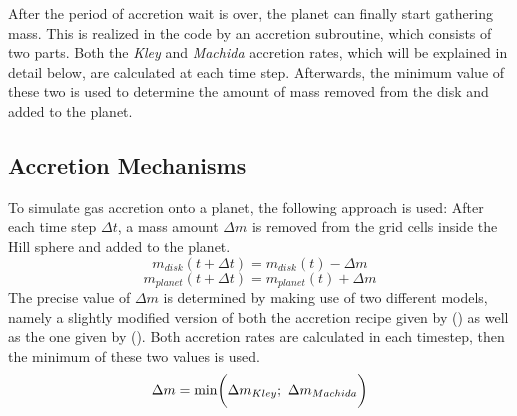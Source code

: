     After the period of accretion wait is over, the planet can finally 
    start gathering mass. This is realized in the code by an accretion
    subroutine, which consists of two parts. Both the \textit{Kley} 
    and \textit{Machida} accretion rates, which will be explained in 
    detail below, are calculated at each time step.
    Afterwards, the minimum value of these two is used to determine 
    the amount of mass removed from the disk and added to the planet.

    \subsection{Accretion Mechanisms}
      To simulate gas accretion onto a planet, the following approach is used:
      After each time step $\Delta t$, a mass amount $\Delta m$ is 
      removed from the grid cells inside the Hill sphere and added to 
      the planet. %
      \begin{equation}
        m_{disk}(t+\Delta t)=m_{disk}(t)-\Delta m
      \end{equation}
      \begin{equation}
        m_{planet}(t+\Delta t)=m_{planet}(t)+\Delta m
      \end{equation}
      The precise value of $\Delta m$ is determined by making use of two 
      different models, namely a slightly modified 
      version of both the accretion recipe given by 
      \citeauthor{Kley_1999} (\citeyear{Kley_1999})
      as well as the one given by \citeauthor{Machida_2010}
      (\citeyear{Machida_2010}).
      Both accretion rates are calculated in each timestep,
      then the minimum of these two values is used.
      \begin{equation}
        \Delta m = \textnormal{min}\bigg(
        \Delta m_{Kley};\ 
        \Delta m_{Machida}\bigg)
      \end{equation} \ \\

